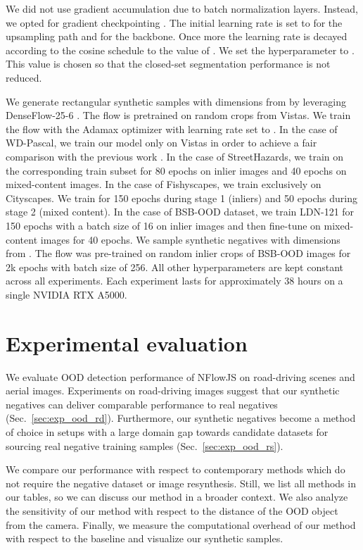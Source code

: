 \documentclass[lettersize,journal,hidelinks]{IEEEtran}
\begin{document}
We did not use gradient accumulation due to batch normalization layers.
Instead, we opted for gradient checkpointing \cite{bulo18cvpr,barron19cvpr,kreso21tits}.
The initial learning rate is set to  for the upsampling path and  for the backbone.
Once more the learning rate is decayed according to the cosine schedule to the value of .
We set the hyperparameter  to .
This value is chosen so that the closed-set segmentation performance is not reduced.

We generate rectangular synthetic samples
with dimensions from 
by leveraging DenseFlow-25-6 \cite{grcic21neurips}.
The flow is pretrained on random  crops from Vistas.
We train the flow with the Adamax optimizer with learning rate set to .
In the case of WD-Pascal, we train our model only on Vistas in order to achieve a fair comparison with the previous work \cite{bevandic19gcpr}.
In the case of StreetHazards, we train on the corresponding train subset for 80 epochs on inlier images and 40 epochs on mixed-content images.
In the case of Fishyscapes, we train exclusively on Cityscapes.
We train for 150 epochs during stage 1 (inliers) and 50 epochs during
stage 2 (mixed content).
In the case of BSB-OOD dataset, we train LDN-121 for 150 epochs with a batch size of 16 on inlier images and then fine-tune on mixed-content images for 40 epochs.
We sample synthetic negatives with dimensions from  .
The flow was pre-trained on  random inlier crops of BSB-OOD images for 2k epochs with batch size of 256.
All other hyperparameters are kept constant across all experiments.
Each experiment lasts for approximately 38 hours on a single NVIDIA RTX A5000.


\section{Experimental evaluation}


We evaluate OOD detection performance of NFlowJS on 
road-driving scenes and aerial images.
Experiments on road-driving images suggest that our synthetic negatives can deliver comparable performance to real negatives (Sec.\ \ref{sec:exp_ood_rd}).
Furthermore, our synthetic negatives become a method of choice in setups 
with a large domain gap towards candidate datasets for sourcing real negative training samples (Sec.\ \ref{sec:exp_ood_rs}).

We compare our performance with respect to contemporary methods which do not require the negative dataset or image resynthesis.
Still, we list all methods in our tables, so we can discuss our method in a broader context.
We also analyze the sensitivity of our method with respect to the distance of the OOD object from the camera.
Finally, we measure the computational overhead of our method with respect to the baseline and visualize our synthetic samples.
\end{document}
